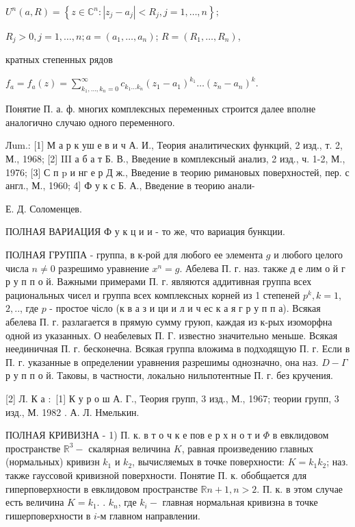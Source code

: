\documentclass[10pt]{article}
\begin{document}
$U^{n}(a, R)=\left\{z \in \mathbb{C}^{n}:\left|z_{j}-a_{j}\right|<R_{j}, j=1, \ldots, n\right\} ;$



$R_{j}>0, j=1, \ldots, n ; a=\left(a_{1}, \ldots, a_{n}\right)$; $R=\left(R_{1}, \ldots, R_{n}\right)$,



кратных степенных рядов



$f_{a}=f_{a}(z)=\sum_{k_{1}, \ldots, k_{n}=0}^{\infty} c_{k_{1} \ldots k_{n}}\left(z_{1}-a_{1}\right)^{k_{1}} \ldots\left(z_{n}-a_{n}\right)^{k}$.



Понятие П. а. ф. многих комплексных переменных строится далее вполне аналогично случаю одного переменного.



Лum.: [1] М а р к уш е в и ч А. И., Теория аналитических функций, 2 изд., т. 2, М., 1968; [2] III а б а т Б. В., Введение в комплексный анализ, 2 изд., ч. 1-2, М., 1976; [3] С п p и нг е р Д ж., Введение в теорию римановых поверхностей, пер. с англ., М., 1960; 4] Ф у к с Б. А., Введение в теорию анали-



Е. Д. Соломенцев.



ПОЛНАЯ ВАРИАЦИЯ Ф у к ц и и - то же, что вариация бункции.



ПОЛНАЯ ГРУППА - группа, в к-рой для любого ее элемента $g$ и любого целого числа $n \neq 0$ разрешимо уравнение $x^{n}=g$. Абелева П. г. наз. также д е лим о й г р у п п о й. Важными примерами П. г. являются аддитивная группа всех рациональных чисел и группа всех комплексных корней из 1 степеней $p^{k}, k=1$, $2, . .$, где $p$ - простое чісло (к в а з и ци и л и ч ес к а я г р у п п а). Всякая абелева П. г. разлагается в прямую сумму груюп, каждая из к-рых изоморфна одной из указанных. О неабелевых П. Г. известно значительно меньше. Всякая неединичная П. г. бесконечна. Всякая группа вложима в подходящую П. г. Если в П. г. указанные в определении уравнения разрешимы однозначно, она наз. $D-\Gamma$ р у п п о й. Таковы, в частности, локально нильпотентные П. г. без кручения.



[2] Л. К а $:$ [1] К у р о ш А. Г., Теория групп, 3 изд., М., 1967; теории групп, 3 изд., М. 1982 . А. Л. Нмелькин.



ПОЛНАЯ КРИВИЗНА - 1) П. к. в т о ч к е пов е р х н о т и $\Phi$ в евклидовом пространстве $\mathbb{R}^{3}-$ скалярная величина $K$, равная произведению главных (нормальных) кривизн $k_{1}$ и $k_{2}$, вычисляемых в точке поверхности: $K=k_{1} k_{2}$; наз. также гауссовой кривизной поверхности. Понятие П. к. обобщается для гиперповерхности в евклидовом пространстве $\mathbb{R} n+1, n>2$. П. к. в этом случае есть величина $K=k_{1}$. . $k_{n}$, где $k_{i}-$ главная нормальная кривизна в точке гишерповерхности в $i$-м главном направлении.
\end{document}
